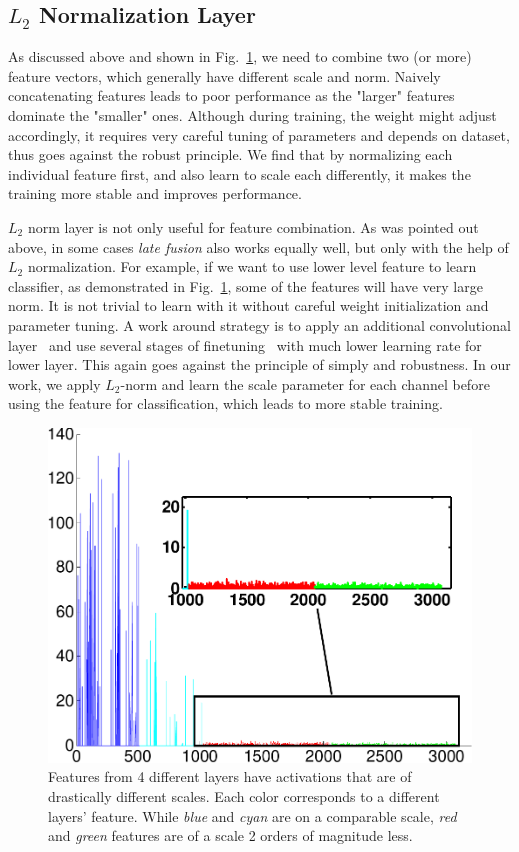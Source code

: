 \documentclass{article} %
\begin{document}
\subsection{$L_2$ Normalization Layer}
\label{sec:l2norm}
As discussed above and shown in Fig.~\ref{fig:differentscale}, we need to combine two (or more) feature vectors, which generally have different scale and norm. Naively concatenating features leads to poor performance as the "larger" features dominate the "smaller" ones. Although during training, the weight might adjust accordingly, it requires very careful tuning of parameters and depends on dataset, thus goes against the robust principle. We find that by normalizing each individual feature first, and also learn to scale each differently, it makes the training more stable and improves performance.

$L_2$ norm layer is not only useful for feature combination. As was pointed out above, in some cases \emph{late fusion} also works equally well, but only with the help of $L_2$ normalization. For example, if we want to use lower level feature to learn classifier, as demonstrated in Fig.~\ref{fig:differentscale}, some of the features will have very large norm. It is not trivial to learn with it without careful weight initialization and parameter tuning. A work around strategy is to apply an additional convolutional layer~\cite{chen2014semantic, hariharan2014hypercolumns} and use several stages of finetuning~\cite{long2014fully} with much lower learning rate for lower layer. This again goes against the principle of simply and robustness. In our work, we apply $L_2$-norm and learn the scale parameter for each channel before using the feature for classification, which leads to more stable training.
\begin{figure}
	\centering
	\includegraphics[width=0.4\linewidth]{figure/features}
	\caption{Features from 4 different layers have activations that are of drastically different scales. Each color corresponds to a different layers' feature. While \emph{\textcolor[rgb]{0,0,1}{blue}} and \emph{\textcolor[rgb]{0,1,1}{cyan}} are on a comparable scale, \emph{\textcolor[rgb]{1,0,0}{red}} and \emph{\textcolor[rgb]{0,1,0}{green}} features are of a scale 2 orders of magnitude less.}
	\label{fig:differentscale}
\end{figure}
\end{document}
